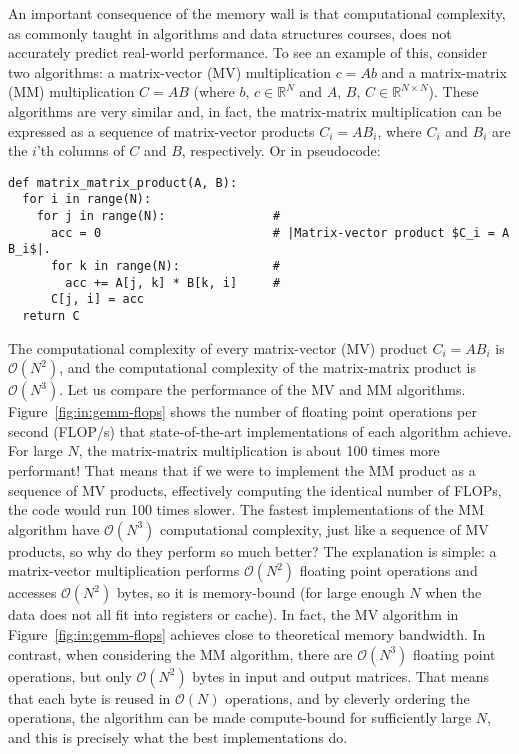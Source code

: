 An important consequence of the memory wall is that computational complexity, as commonly taught in algorithms and data structures courses, does not accurately predict real-world performance. To see an example of this, consider two algorithms: a matrix-vector (MV) multiplication $c = A b$ and a matrix-matrix (MM) multiplication $C = A B$ (where $b,\,c\in \mathbb{R}^N$ and $A,\,B,\,C\in \mathbb{R}^{N\times N}$). These algorithms are very similar and, in fact, the matrix-matrix multiplication can be expressed as a sequence of matrix-vector products $C_i = A B_i$, where $C_i$ and $B_i$ are the $i$'th columns of $C$ and $B$, respectively. Or in pseudocode:
\begin{verbatim}
def matrix_matrix_product(A, B):
  for i in range(N):
    for j in range(N):               #
      acc = 0                        # |Matrix-vector product $C_i = A B_i$|.
      for k in range(N):             # 
        acc += A[j, k] * B[k, i]     #
      C[j, i] = acc
  return C
\end{verbatim}
The computational complexity of every matrix-vector (MV) product $C_i = A B_i$ is $\mathcal{O}(N^2)$, and the computational complexity of the matrix-matrix product is $\mathcal{O}(N^3)$. Let us compare the performance of the MV and MM algorithms. Figure~\ref{fig:in:gemm-flops} shows the number of floating point operations per second (FLOP/s) that state-of-the-art implementations of each algorithm achieve. For large $N$, the matrix-matrix multiplication is about 100 times more performant! That means that if we were to implement the MM product as a sequence of MV products, effectively computing the identical number of FLOPs, the code would run 100 times slower. The fastest implementations of the MM algorithm have $\mathcal{O}(N^3)$ computational complexity, just like a sequence of MV products, so why do they perform so much better? The explanation is simple: a matrix-vector multiplication performs $\mathcal{O}(N^2)$ floating point operations and accesses $\mathcal{O}(N^2)$ bytes, so it is memory-bound (for large enough $N$ when the data does not all fit into registers or cache). In fact, the MV algorithm in Figure~\ref{fig:in:gemm-flops} achieves close to theoretical memory bandwidth. In contrast, when considering the MM algorithm, there are $\mathcal{O}(N^3)$ floating point operations, but only $\mathcal{O}(N^2)$ bytes in input and output matrices. That means that each byte is reused in $\mathcal{O}(N)$ operations, and by cleverly ordering the operations, the algorithm can be made compute-bound for sufficiently large $N$, and this is precisely what the best implementations do.

